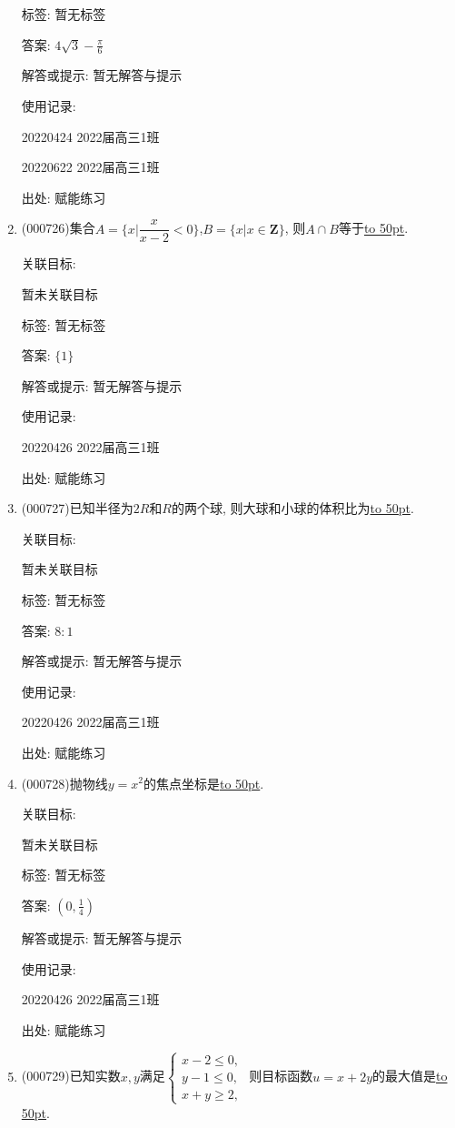 \documentclass[10pt,a4paper]{article}
\newcommand{\blank}[1]{\underline{\hbox to #1pt{}}}
\begin{document}
\begin{enumerate}[1.]
标签: 暂无标签

答案: $4\sqrt 3-\frac{\pi}6$

解答或提示: 暂无解答与提示

使用记录:

20220424	2022届高三1班	

20220622	2022届高三1班  	


出处: 赋能练习
\item { (000726)}集合$A=\{x|\dfrac x{x-2}<0\}$,$B=\{x|x\in \mathbf{Z}\}$, 则$A\cap B$等于\blank{50}.


关联目标:

暂未关联目标



标签: 暂无标签

答案: $\{1\}$

解答或提示: 暂无解答与提示

使用记录:

20220426	2022届高三1班	


出处: 赋能练习
\item { (000727)}已知半径为$2R$和$R$的两个球, 则大球和小球的体积比为\blank{50}.


关联目标:

暂未关联目标



标签: 暂无标签

答案: $8:1$

解答或提示: 暂无解答与提示

使用记录:

20220426	2022届高三1班	


出处: 赋能练习
\item { (000728)}抛物线$y=x^2$的焦点坐标是\blank{50}.


关联目标:

暂未关联目标



标签: 暂无标签

答案: $(0,\frac 14)$

解答或提示: 暂无解答与提示

使用记录:

20220426	2022届高三1班	


出处: 赋能练习
\item { (000729)}已知实数$x,y$满足$\begin{cases} x-2\le 0, \\ y-1\le 0, \\ x+y\ge 2,\end{cases}$ 则目标函数$u=x+2y$的最大值是\blank{50}.



\end{enumerate}
\end{document}
